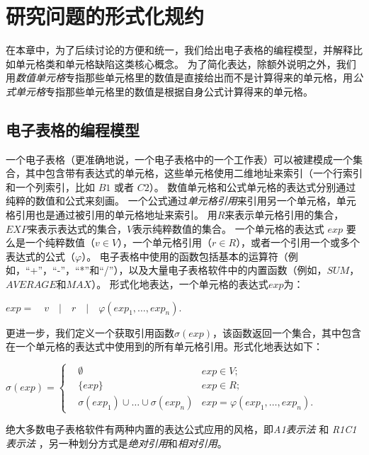 \chapter{研究问题的形式化规约}

在本章中，为了后续讨论的方便和统一，我们给出电子表格的编程模型，并解释比如单元格类和单元格缺陷这类核心概念。
为了简化表达，除额外说明之外，我们用\textit{数值单元格}专指那些单元格里的数值是直接给出而不是计算得来的单元格，用\textit{公式单元格}专指那些单元格里的数值是根据自身公式计算得来的单元格。

\section{电子表格的编程模型}

一个电子表格（更准确地说，一个电子表格中的一个工作表）可以被建模成一个集合，其中包含带有表达式的单元格，这些单元格使用二维地址来索引（一个行索引和一个列索引，比如 $B1$ 或者 $C2$）。
数值单元格和公式单元格的表达式分别通过纯粹的数值和公式来刻画。
一个公式通过\textit{单元格引用}来引用另一个单元格，单元格引用也是通过被引用的单元格地址来索引。
用$R$来表示单元格引用的集合，$EXP$来表示表达式的集合，$V$表示纯粹数值的集合。
一个单元格的表达式 $exp$ 要么是一个纯粹数值（$v \in V$），一个单元格引用（$r \in R$），或者一个引用一个或多个表达式的公式（$\varphi $）。
电子表格中使用的函数包括基本的运算符（例如，“+”，“-”，“*”和“/”），以及大量电子表格软件中的内置函数（例如，$SUM$，$AVERAGE$和$MAX$）。
形式化地表达，一个单元格的表达式$exp$为：
\begin{definition}
    $ exp =\quad v\quad |\quad r\quad |\quad \varphi (exp_1,\dots,exp_n). $
\end{definition}

更进一步，我们定义一个获取引用函数$\sigma(exp)$，该函数返回一个集合，其中包含在一个单元格的表达式中使用到的所有单元格引用。形式化地表达如下：
\begin{definition}
$
\sigma(exp) = 
\left\{
    \begin{aligned}
       & \emptyset & exp \in V; \\
       & \{exp\}     & exp \in R; \\
       & \sigma(exp_1) \cup \dots \cup \sigma(exp_n) & exp = \varphi(exp_1, \dots , exp_n).
    \end{aligned}
\right.
$
\end{definition}





\begin{definition}
    绝大多数电子表格软件有两种内置的表达公式应用的风格，即\textit{A1表示法} 和 \textit{R1C1表示法} \cite{tan2014bug} ，另一种划分方式是\textit{绝对引用}和\textit{相对引用}。
\end{definition}

